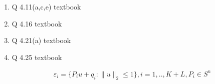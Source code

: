 \documentclass[12pt,letter]{article}
\newcommand{\norm}[1]{\|#1\|}
\newcommand{\set}[1]{\{#1\}}
\begin{document}


\begin{enumerate}
  
\item Q 4.11(a,c,e) textbook
  
\item Q 4.16 textbook
  
\item Q 4.21(a) textbook
  
\item Q 4.25 textbook
  
  \begin{align*}
    \varepsilon_i = \set{P_i u + q_i: \norm{u}_2 \leq 1}, i=1,..,K+L, P_i \in S^n
  \end{align*}


\end{enumerate}
\end{document}
